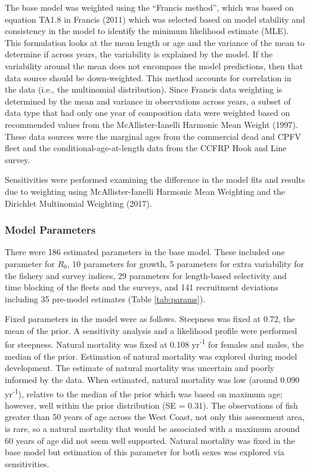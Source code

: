 \documentclass[11pt,
  english,
  letterpaper,
]{article}
\begin{document}
The base model was weighted using the ``Francis method'', which was based on equation TA1.8 in Francis (2011) which was selected based on model stability and consistency in the model to identify the minimum likelihood estimate (MLE). This formulation looks at the mean length or age and the variance of the mean to determine if across years, the variability is explained by the model. If the variability around the mean does not encompass the model predictions, then that data source should be down-weighted. This method accounts for correlation in the data (i.e., the multinomial distribution). Since Francis data weighting is determined by the mean and variance in observations across years, a subset of data type that had only one year of composition data were weighted based on recommended values from the McAllister-Ianelli Harmonic Mean Weight (1997). These data sources were the marginal ages from the commercial dead and CPFV fleet and the conditional-age-at-length data from the CCFRP Hook and Line survey.

Sensitivities were performed examining the difference in the model fits and results due to weighting using McAllister-Ianelli Harmonic Mean Weighting and the Dirichlet Multinomial Weighting (2017).

\hypertarget{model-parameters}{%
\subsubsection{Model Parameters}\label{model-parameters}}

There were 186 estimated parameters in the base model. These included one parameter for \(R_0\), 10 parameters for growth, 5 parameters for extra variability for the fishery and survey indices, 29 parameters for length-based selectivity and time blocking of the fleets and the surveys, and 141 recruitment deviations including 35 pre-model estimates (Table \ref{tab:params}).

Fixed parameters in the model were as follows. Steepness was fixed at 0.72, the mean of the prior. A sensitivity analysis and a likelihood profile were performed for steepness. Natural mortality was fixed at 0.108 yr\textsuperscript{-1} for females and males, the median of the prior. Estimation of natural mortality was explored during model development. The estimate of natural mortality was uncertain and poorly informed by the data. When estimated, natural mortality was low (around 0.090 yr\textsuperscript{-1}), relative to the median of the prior which was based on maximum age; however, well within the prior distribution (SE = 0.31). The observations of fish greater than 50 years of age across the West Coast, not only this assessment area, is rare, so a natural mortality that would be associated with a maximum around 60 years of age did not seem well supported. Natural mortality was fixed in the base model but estimation of this parameter for both sexes was explored via sensitivities.
\end{document}
